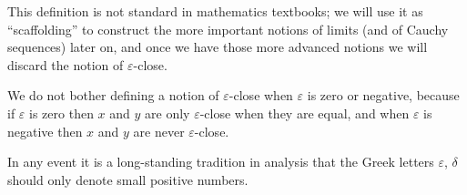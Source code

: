 \begin{rmk}\label{4.3.5}
  This definition is not standard in mathematics textbooks;
  we will use it as ``scaffolding'' to construct the more important notions of limits (and of Cauchy sequences) later on, and once we have those more advanced notions we will discard the notion of \(\varepsilon\)-close.
\end{rmk}

\begin{note}
  We do not bother defining a notion of \(\varepsilon\)-close when \(\varepsilon\) is zero or negative, because if \(\varepsilon\) is zero then \(x\) and \(y\) are only \(\varepsilon\)-close when they are equal, and when \(\varepsilon\) is negative then \(x\) and \(y\) are never \(\varepsilon\)-close.
\end{note}

\begin{note}
  In any event it is a long-standing tradition in analysis that the Greek letters \(\varepsilon\), \(\delta\) should only denote small positive numbers.
\end{note}

